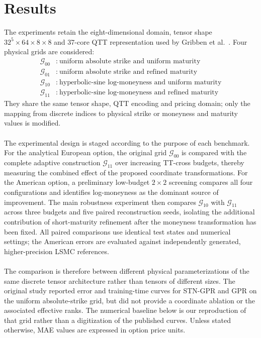 \documentclass{article}
\numberwithin{equation}{subsection}
\theoremstyle{definition}
\theoremstyle{remark}
\begin{document}
\section{Results}
\label{sec:results}
The experiments retain the eight-dimensional domain, tensor shape
\(32^5\times64\times8\times8\) and 37-core QTT representation used by
Gribben et al.\ \cite{Gribben2026STNGPR}. Four physical grids are considered:
\[
\begin{aligned}
\mathcal{G}_{00}&:\ \text{uniform absolute strike and uniform maturity}
\\
\mathcal{G}_{01}&:\ \text{uniform absolute strike and refined maturity}
\\
\mathcal{G}_{10}&:\ \text{hyperbolic-sine log-moneyness and uniform maturity}
\\
\mathcal{G}_{11}&:\ \text{hyperbolic-sine log-moneyness and refined maturity}
\end{aligned}
\]
They share the same tensor shape, QTT encoding and pricing domain; only the
mapping from discrete indices to physical strike or moneyness and maturity
values is modified.\\
\\
The experimental design is staged according to the purpose of each benchmark.
For the analytical European option, the original grid
\(\mathcal{G}_{00}\) is compared with the complete adaptive construction
\(\mathcal{G}_{11}\) over increasing TT-cross budgets, thereby measuring the
combined effect of the proposed coordinate transformations. For the American
option, a preliminary low-budget \(2\times2\) screening compares all four
configurations and identifies log-moneyness as the dominant source of
improvement. The main robustness experiment then compares
\(\mathcal{G}_{10}\) with \(\mathcal{G}_{11}\) across three budgets and five
paired reconstruction seeds, isolating the additional contribution of
short-maturity refinement after the moneyness transformation has been fixed.
All paired comparisons use identical test states and numerical settings; the
American errors are evaluated against independently generated,
higher-precision LSMC references.\\
\\
The comparison is therefore between different physical parameterizations of
the same discrete tensor architecture rather than tensors of different sizes.
The original study reported error and training-time curves for STN-GPR and GPR
on the uniform absolute-strike grid, but did not provide a coordinate ablation
or the associated effective ranks. The numerical baseline below is our
reproduction of that grid rather than a digitization of the published curves.
Unless stated otherwise, MAE values are expressed in option price units.
\end{document}
